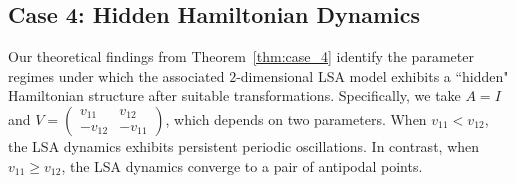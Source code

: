 \documentclass[10pt]{article}
\theoremstyle{definition}
\theoremstyle{definition}
\numberwithin{equation}{section}
\begin{document}

\subsection{Case 4: Hidden Hamiltonian Dynamics}
\label{sec:exp_case4}
Our theoretical findings from Theorem~\ref{thm:case_4} identify the parameter regimes under which the associated $2$-dimensional LSA model exhibits a ``hidden" Hamiltonian structure after suitable transformations.
Specifically, we take $A = I$ and $V = \left(\begin{smallmatrix} v_{11} & v_{12} \\ -v_{12} & -v_{11} \end{smallmatrix}\right)$, which depends on two parameters.
When $v_{11} < v_{12}$, the LSA dynamics exhibits persistent periodic oscillations.
In contrast, when $v_{11} \geq v_{12}$, the LSA dynamics converge to a pair of antipodal points.
\end{document}
